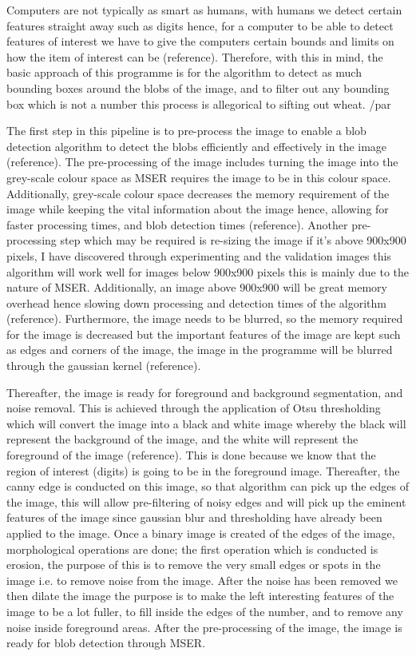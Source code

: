 \documentclass[
	12pt, %
]{fphw}
\begin{document}
Computers are not typically as smart as humans, with humans we detect certain features straight away such as digits hence, for a computer to be able to detect features of interest we have to give the computers certain bounds and limits on how the item of interest can be (reference). Therefore, with this in mind, the basic approach of this programme is for the algorithm to detect as much bounding boxes around the blobs of the image, and to filter out any bounding box which is not a number this process is allegorical to sifting out wheat. /par

The first step in this pipeline is to pre-process the image to enable a blob detection algorithm to detect the blobs efficiently and effectively in the image (reference). The pre-processing of the image includes turning the image into the grey-scale colour space as MSER requires the image to be in this colour space. Additionally, grey-scale colour space decreases the memory requirement of the image while keeping the vital information about the image hence, allowing for faster processing times, and blob detection times (reference). Another pre-processing step which may be required is re-sizing the image if it’s above 900x900 pixels, I have discovered through experimenting and the validation images this algorithm will work well for images below 900x900 pixels this is mainly due to the nature of MSER. Additionally, an image above 900x900 will be great memory overhead hence slowing down processing and detection times of the algorithm (reference). Furthermore, the image needs to be blurred, so the memory required for the image is decreased but the important features of the image are kept such as edges and corners of the image, the image in the programme will be blurred through the gaussian kernel (reference). \par

Thereafter, the image is ready for foreground and background segmentation, and noise removal. This is achieved through the application of Otsu thresholding which will convert the image into a black and white image whereby the black will represent the background of the image, and the white will represent the foreground of the image (reference). This is done because we know that the region of interest (digits) is going to be in the foreground image. Thereafter, the canny edge is conducted on this image, so that algorithm can pick up the edges of the image, this will allow pre-filtering of noisy edges and will pick up the eminent features of the image since gaussian blur and thresholding have already been applied to the image. Once a binary image is created of the edges of the image, morphological operations are done; the first operation which is conducted is erosion, the purpose of this is to remove the very small edges or spots in the image i.e. to remove noise from the image. After the noise has been removed we then dilate the image the purpose is to make the left interesting features of the image to be a lot fuller, to fill inside the edges of the number, and to remove any noise inside foreground areas. After the pre-processing of the image, the image is ready for blob detection through MSER.\par
\end{document}
